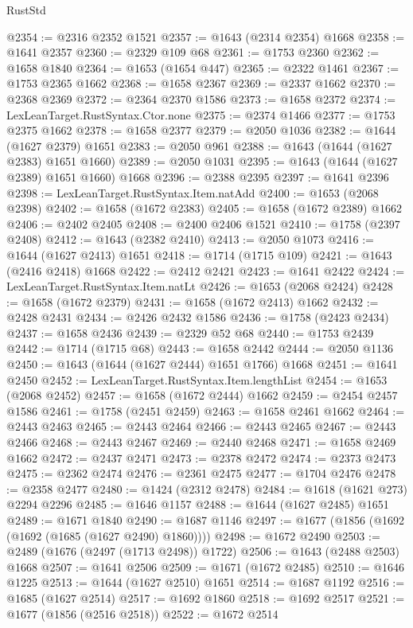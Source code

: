 \begin{lexlean}{RustStd}
\begin{coremodule}
@2354 := @2316 @2352 @1521
@2357 := @1643 (@2314 @2354) @1668
@2358 := @1641 @2357
@2360 := @2329 @109 @68
@2361 := @1753 @2360
@2362 := @1658 @1840
@2364 := @1653 (@1654 @447)
@2365 := @2322 @1461
@2367 := @1753 @2365 @1662
@2368 := @1658 @2367
@2369 := @2337 @1662
@2370 := @2368 @2369
@2372 := @2364 @2370 @1586
@2373 := @1658 @2372
@2374 := LexLeanTarget.RustSyntax.Ctor.none
@2375 := @2374 @1466
@2377 := @1753 @2375 @1662
@2378 := @1658 @2377
@2379 := @2050 @1036
@2382 := @1644 (@1627 @2379) @1651
@2383 := @2050 @961
@2388 := @1643 (@1644 (@1627 @2383) @1651 @1660)
@2389 := @2050 @1031
@2395 := @1643 (@1644 (@1627 @2389) @1651 @1660) @1668
@2396 := @2388 @2395
@2397 := @1641 @2396
@2398 := LexLeanTarget.RustSyntax.Item.natAdd
@2400 := @1653 (@2068 @2398)
@2402 := @1658 (@1672 @2383)
@2405 := @1658 (@1672 @2389) @1662
@2406 := @2402 @2405
@2408 := @2400 @2406 @1521
@2410 := @1758 (@2397 @2408)
@2412 := @1643 (@2382 @2410)
@2413 := @2050 @1073
@2416 := @1644 (@1627 @2413) @1651
@2418 := @1714 (@1715 @109)
@2421 := @1643 (@2416 @2418) @1668
@2422 := @2412 @2421
@2423 := @1641 @2422
@2424 := LexLeanTarget.RustSyntax.Item.natLt
@2426 := @1653 (@2068 @2424)
@2428 := @1658 (@1672 @2379)
@2431 := @1658 (@1672 @2413) @1662
@2432 := @2428 @2431
@2434 := @2426 @2432 @1586
@2436 := @1758 (@2423 @2434)
@2437 := @1658 @2436
@2439 := @2329 @52 @68
@2440 := @1753 @2439
@2442 := @1714 (@1715 @68)
@2443 := @1658 @2442
@2444 := @2050 @1136
@2450 := @1643 (@1644 (@1627 @2444) @1651 @1766) @1668
@2451 := @1641 @2450
@2452 := LexLeanTarget.RustSyntax.Item.lengthList
@2454 := @1653 (@2068 @2452)
@2457 := @1658 (@1672 @2444) @1662
@2459 := @2454 @2457 @1586
@2461 := @1758 (@2451 @2459)
@2463 := @1658 @2461 @1662
@2464 := @2443 @2463
@2465 := @2443 @2464
@2466 := @2443 @2465
@2467 := @2443 @2466
@2468 := @2443 @2467
@2469 := @2440 @2468
@2471 := @1658 @2469 @1662
@2472 := @2437 @2471
@2473 := @2378 @2472
@2474 := @2373 @2473
@2475 := @2362 @2474
@2476 := @2361 @2475
@2477 := @1704 @2476
@2478 := @2358 @2477
@2480 := @1424 (@2312 @2478)
@2484 := @1618 (@1621 @273) @2294 @2296
@2485 := @1646 @1157
@2488 := @1644 (@1627 @2485) @1651
@2489 := @1671 @1840
@2490 := @1687 @1146
@2497 := @1677 (@1856 (@1692 (@1692 (@1685 (@1627 @2490) @1860))))
@2498 := @1672 @2490
@2503 := @2489 (@1676 (@2497 (@1713 @2498)) @1722)
@2506 := @1643 (@2488 @2503) @1668
@2507 := @1641 @2506
@2509 := @1671 (@1672 @2485)
@2510 := @1646 @1225
@2513 := @1644 (@1627 @2510) @1651
@2514 := @1687 @1192
@2516 := @1685 (@1627 @2514)
@2517 := @1692 @1860
@2518 := @1692 @2517
@2521 := @1677 (@1856 (@2516 @2518))
@2522 := @1672 @2514

\end{coremodule}
\end{lexlean}
